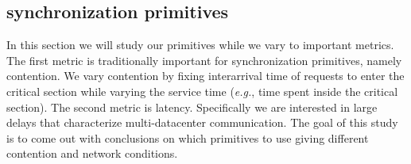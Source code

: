 \subsection{synchronization primitives}

In this section we will study our primitives while we vary to important metrics. The first metric is traditionally important for synchronization primitives, namely contention. We vary contention by fixing interarrival time of requests to enter the critical section while varying the service time (\emph{e.g.}, time spent inside the critical section). The second metric is latency. Specifically we are interested in large delays that characterize multi-datacenter communication. The goal of this study is to come out with conclusions on which primitives to use giving different contention and network conditions.

